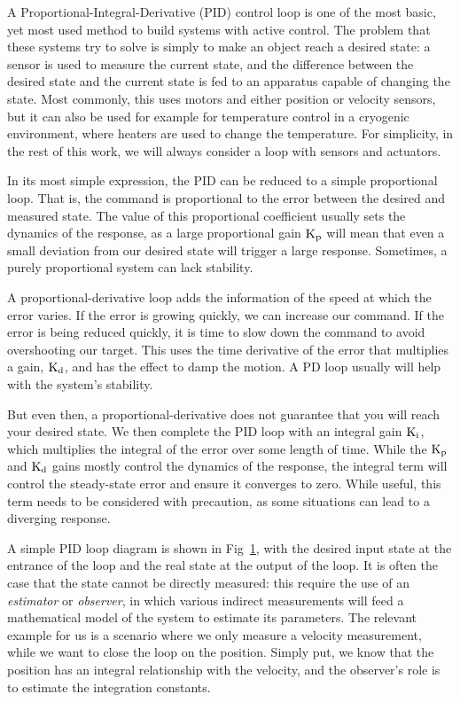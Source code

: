 A Proportional-Integral-Derivative (PID) control loop is one of the most basic, yet most used method to build systems with active control. The problem that these systems try to solve is simply to make an object reach a desired state: a sensor is used to measure the current state, and the difference between the desired state and the current state is fed to an apparatus capable of changing the state. Most commonly, this uses motors and either position or velocity sensors, but it can also be used for example for temperature control in a cryogenic environment, where heaters are used to change the temperature. For simplicity, in the rest of this work, we will always consider a loop with sensors and actuators. 

In its most simple expression, the PID can be reduced to a simple proportional loop. That is, the command is proportional to the error between the desired and measured state. The value of this proportional coefficient usually sets the dynamics of the response, as a large proportional gain $\textrm{K}_\textrm{p}$ will mean that even a small deviation from our desired state will trigger a large response. Sometimes, a purely proportional system can lack stability.

A proportional-derivative loop adds the information of the speed at which the error varies. If the error is growing quickly, we can increase our command. If the error is being reduced quickly, it is time to slow down the command to avoid overshooting our target. This uses the time derivative of the error that multiplies a gain, $\textrm{K}_\textrm{d}$, and has the effect to damp the motion. A PD loop usually will help with the system's stability.

But even then, a proportional-derivative does not guarantee that you will reach your desired state. We then complete the PID loop with an integral gain $\textrm{K}_\textrm{i}$, which multiplies the integral of the error over some length of time. While the $\textrm{K}_\textrm{p}$ and $\textrm{K}_\textrm{d}$ gains mostly control the dynamics of the response, the integral term will control the steady-state error and ensure it converges to zero. While useful, this term needs to be considered with precaution, as some situations can lead to a diverging response.

\begin{figure}[!ht]
	\centering
	
	\caption{}
	\label{fig:SimplePID}
    \end{figure}



A simple PID loop diagram is shown in Fig~\ref{fig:SimplePID}, with the desired input state at the entrance of the loop and the real state at the output of the loop. It is often the case that the state cannot be directly measured: this require the use of an \textit{estimator} or \textit{observer}, in which various indirect measurements will feed a mathematical model of the system to estimate its parameters. The relevant example for us is a scenario where we only measure a velocity measurement, while we want to close the loop on the position. Simply put, we know that the position has an integral relationship with the velocity, and the observer's role is to estimate the integration constants.

